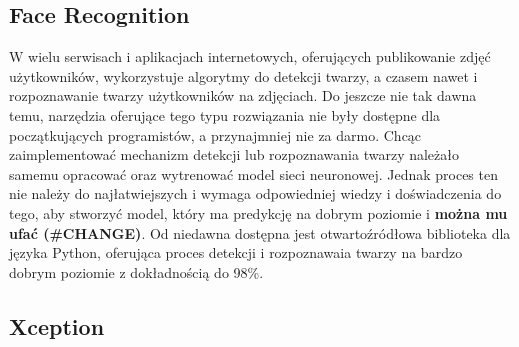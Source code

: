 \subsection{Face Recognition}
W wielu serwisach i aplikacjach internetowych, oferujących publikowanie zdjęć użytkowników, wykorzystuje algorytmy do detekcji twarzy, a czasem nawet i rozpoznawanie twarzy użytkowników na zdjęciach. Do jeszcze nie tak dawna temu, narzędzia oferujące tego typu rozwiązania nie były dostępne dla początkujących programistów, a przynajmniej nie za darmo. Chcąc zaimplementować mechanizm detekcji lub rozpoznawania twarzy należało samemu opracować oraz wytrenować model sieci neuronowej. Jednak proces ten nie należy do najłatwiejszych i wymaga odpowiedniej wiedzy i doświadczenia do tego, aby stworzyć model, który ma predykcję na dobrym poziomie i \textbf{można mu ufać (#CHANGE)}.
Od niedawna dostępna jest otwartoźródłowa biblioteka dla języka Python, oferująca proces detekcji i rozpoznawaia twarzy na bardzo dobrym poziomie z dokładnością do 98\%.\\

\subsection{Xception}
